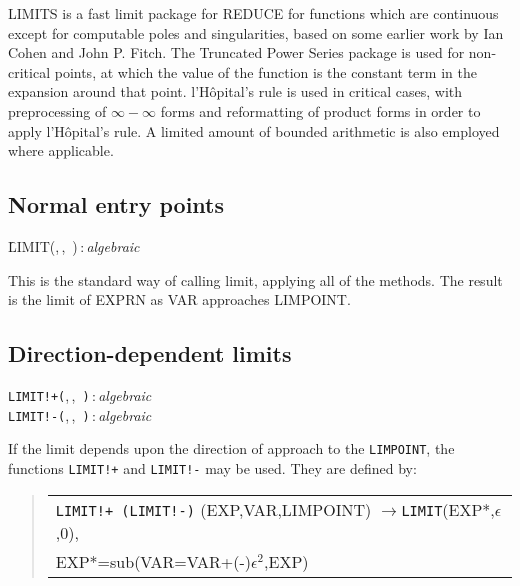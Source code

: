 LIMITS is a fast limit package for REDUCE for functions which are
continuous except for computable poles and singularities, based on some
earlier work by Ian Cohen and John P. Fitch.  The Truncated Power Series
package is used for non-critical points, at which the value of the
function is the constant term in the expansion around that point.
l'H\^opital's rule is used in critical cases, with preprocessing of
$\infty - \infty$ forms and reformatting of product forms in order
to apply l'H\^opital's rule.  A limited amount of bounded arithmetic
is also employed where applicable.

\subsection{Normal entry points}
\hypertarget{operator:LIMIT}{}
\begin{syntax}
  \f{LIMIT(},\,,\,%
    )\,:\,\textit{algebraic}
\end{syntax}

This is the standard way of calling limit, applying all of the methods. The
result is the limit of EXPRN as VAR approaches LIMPOINT.


\subsection{Direction-dependent limits}

 
\hypertarget{operator:LIMIT+}{}
\hypertarget{operator:LIMIT-}{}
\begin{syntaxtable}
  \texttt{LIMIT!+(},\,,\,%
    \texttt{)}\,:\,\textit{algebraic} \\
  \texttt{LIMIT!-(},\,,\,%
    \texttt{)}\,:\,\textit{algebraic}
\end{syntaxtable}

If the limit depends upon the direction of approach to the \texttt{LIMPOINT},
the functions \texttt{LIMIT!+} and \texttt{LIMIT!-} may be used.  They are
defined by:
\begin{quote}
\begin{tabular}{l}
 \texttt{LIMIT!+ (LIMIT!-)} (EXP,VAR,LIMPOINT) $\rightarrow$\texttt{LIMIT}(EXP*,$\epsilon$,0), \\
  \qquad EXP*=sub(VAR=VAR+(-)$\epsilon^2$,EXP)
\end{tabular}
\end{quote}

